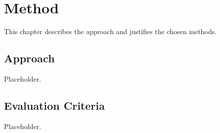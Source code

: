 
\chapter{Method}\label{ch:method}

This chapter describes the approach and justifies the chosen methods.

\section{Approach}\label{sec:approach}

Placeholder.

\section{Evaluation Criteria}\label{sec:criteria}

Placeholder.
